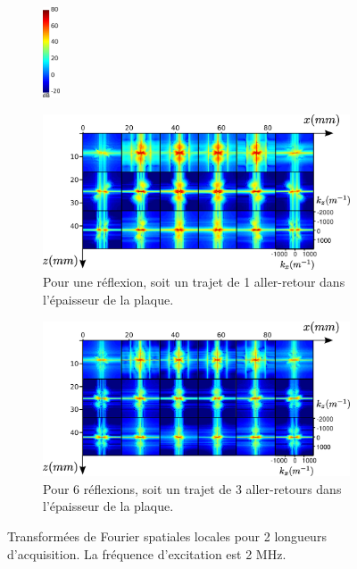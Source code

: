 \begin{figure}[!h]
    \centering
    \begin{subfigure}[b]{0.05\textwidth}
 		\hspace{-2cm}\includegraphics[width=0.5cm]{img/echelle_fft.png}\vspace{2.1cm}
	\end{subfigure}
    \begin{subfigure}[b]{0.4\textwidth}
		\hspace{-3cm}\includegraphics[width=1.5\textwidth]{img/1400pt.png}
		\caption{Pour une réflexion, soit un trajet de 1 aller-retour dans l'épaisseur de la plaque.}
		\label{app:1400pt}
	\end{subfigure}	
	\hspace{0.7cm}
	\begin{subfigure}[b]{0.4\textwidth}
		\hspace{-0.7cm}\includegraphics[width=1.5\textwidth]{img/4200pt.png}
		\caption{Pour 6 réflexions, soit un trajet de 3 aller-retours dans l'épaisseur de la plaque.}
		\label{app:4200pt}
	\end{subfigure}
	\caption{Transformées de Fourier spatiales locales pour 2 longueurs d'acquisition. La fréquence d'excitation est 2 MHz.}
\end{figure}

